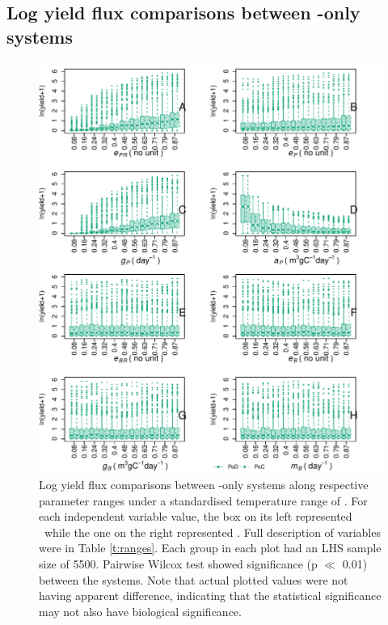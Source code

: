 \documentclass[../thesis.tex]{subfiles} %
\begin{document}
\subsection{Log yield flux comparisons between \phy-only systems}
\begin{figure}[H]
    \centering
    \includegraphics[width=.95\linewidth]{result/harvP.pdf}
    \caption[Log yield flux comparisons between \phy-only systems]{Log yield flux comparisons between \phy-only systems along respective parameter ranges under a standardised temperature range of \temp.  For each independent variable value, the box on its left represented \PoN\ while the one on the right represented \PoH.  Full description of variables were in Table \ref{t:ranges}.  Each group in each plot had an LHS sample size of 5500.  Pairwise Wilcox test showed significance (p $\ll$ 0.01) between the systems.  Note that actual plotted values were not having apparent difference, indicating that the statistical significance may not also have biological significance.}
    \label{f:harvPo}
\end{figure}
\end{document}
